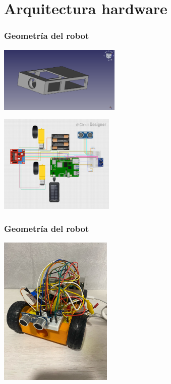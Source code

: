 \documentclass{beamer}
\begin{document}
\section{Arquitectura hardware}
\begin{frame}
\frametitle{Geometría del robot}
\centering
\begin{minipage}{0.45\textwidth}
    \centering
    \includegraphics[width=5.8cm]{figs/base.png}
\end{minipage}
\hfill
\begin{minipage}{0.45\textwidth}
    \centering
    \includegraphics[width=5.5cm]{figs/final_circuito.png}
\end{minipage}

\end{frame}


\begin{frame}
\frametitle{Geometría del robot}
\centering
\begin{minipage}{0.45\textwidth}
    \centering
    \includegraphics[width=5.4cm]{figs/rob.jpeg}
\end{minipage}


\end{frame}
\end{document}
